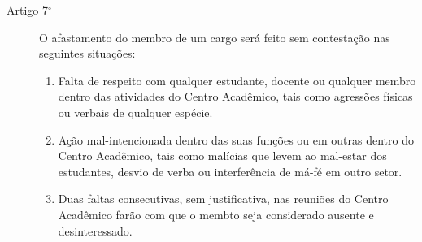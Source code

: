 \documentclass[12pt]{article}
\begin{document}
\begin{description}
    \item[Artigo 7$^\circ$] O afastamento do membro de um cargo será feito sem
        contestação nas seguintes situações:
        \begin{enumerate}[label=arabic*.]
            \item Falta de respeito com qualquer estudante, docente ou qualquer
                membro dentro das atividades do Centro Acadêmico, tais como
                agressões físicas ou verbais de qualquer espécie.
            \item Ação mal-intencionada dentro das suas funções ou em outras
                dentro do Centro Acadêmico, tais como malícias que levem ao
                mal-estar dos estudantes, desvio de verba
                ou interferência de má-fé em outro setor.
            \item Duas faltas consecutivas, sem justificativa, nas reuniões do
                Centro Acadêmico farão com que o membto seja considerado
                ausente e desinteressado.
        \end{enumerate}
\end{description}
\end{document}
